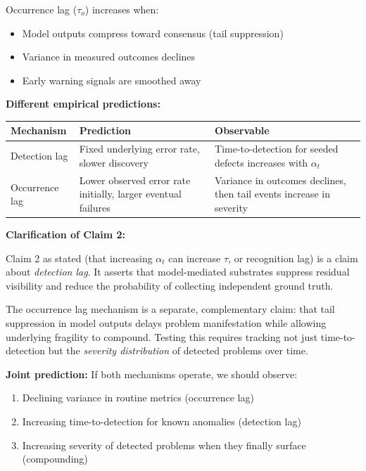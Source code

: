 \documentclass[11pt,a4paper]{article}
\providecommand{\tightlist}{\setlength{\itemsep}{0pt}\setlength{\parskip}{0pt}}
\begin{document}
Occurrence lag ($\tau_{o}$) increases when:

\begin{itemize}
\tightlist
\item
  Model outputs compress toward consensus (tail suppression)
\item
  Variance in measured outcomes declines
\item
  Early warning signals are smoothed away
\end{itemize}

\textbf{Different empirical predictions:}

\begin{longtable}[]{@{}lll@{}}
\toprule\noalign{}
Mechanism & Prediction & Observable \\
\midrule\noalign{}
\endhead
\bottomrule\noalign{}
\endlastfoot
Detection lag & Fixed underlying error rate, slower discovery & Time-to-detection for seeded defects increases with $\alpha_{t}$ \\
Occurrence lag & Lower observed error rate initially, larger eventual failures & Variance in outcomes declines, then tail events increase in severity \\
\end{longtable}

\textbf{Clarification of Claim 2:}

Claim 2 as stated (that increasing $\alpha_{t}$ can increase $\tau$, or recognition lag) is a claim about \emph{detection lag}. It asserts that model-mediated substrates suppress residual visibility and reduce the probability of collecting independent ground truth.

The occurrence lag mechanism is a separate, complementary claim: that tail suppression in model outputs delays problem manifestation while allowing underlying fragility to compound. Testing this requires tracking not just time-to-detection but the \emph{severity distribution} of detected problems over time.

\textbf{Joint prediction:} If both mechanisms operate, we should observe:

\begin{enumerate}
\def\labelenumi{\arabic{enumi}.}
\tightlist
\item
  Declining variance in routine metrics (occurrence lag)
\item
  Increasing time-to-detection for known anomalies (detection lag)
\item
  Increasing severity of detected problems when they finally surface (compounding)
\end{enumerate}
\end{document}
